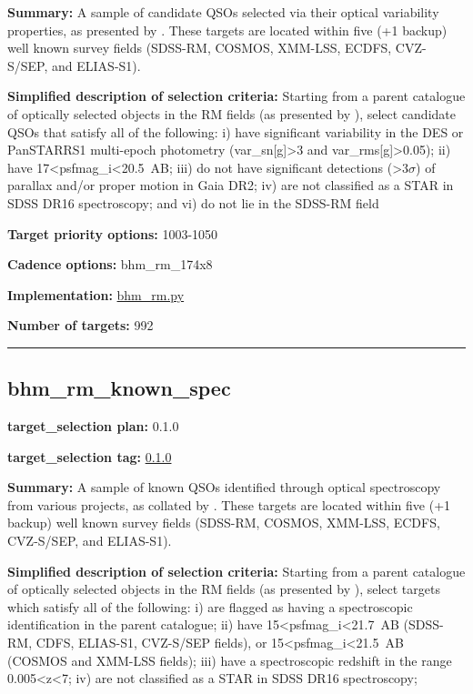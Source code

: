 \noindent\textbf{Summary:} A sample of candidate QSOs selected via their optical
variability properties, as presented by
\citet{Yang2022}. These targets are located within five (+1 backup) well
known survey fields (SDSS-RM, COSMOS, XMM-LSS, ECDFS, CVZ-S/SEP, and
ELIAS-S1).

\noindent\textbf{Simplified description of selection criteria:} Starting from a
parent catalogue of optically selected objects in the RM fields (as
presented by
\citealt{Yang2022}), select candidate QSOs that satisfy all of the
following: i) have significant variability in the DES or PanSTARRS1
multi-epoch photometry (var\_sn{[}g{]}\textgreater3 and
var\_rms{[}g{]}\textgreater0.05); ii) have
17\textless psfmag\_i\textless20.5~AB; iii) do not have significant
detections (\textgreater3$\sigma$) of parallax and/or proper motion in Gaia
DR2; iv) are not classified as a STAR in SDSS DR16 spectroscopy; and vi)
do not lie in the SDSS-RM field


\noindent\textbf{Target priority options:} 1003-1050

\noindent\textbf{Cadence options:} bhm\_rm\_174x8

\noindent\textbf{Implementation:}
\href{https://github.com/sdss/target_selection/blob/0.1.0/python/target_selection/cartons/bhm_rm.py}{bhm\_rm.py}

\noindent\textbf{Number of targets:} 992

\begin{center}\rule{0.5\linewidth}{0.5pt}\end{center}

\hypertarget{bhm_rm_known_spec_plan0.1.0}{%
\subsection{bhm\_rm\_known\_spec}\label{bhm_rm_known_spec_plan0.1.0}}

\noindent\textbf{target\_selection plan:} 0.1.0

\noindent\textbf{target\_selection tag:}
\href{https://github.com/sdss/target_selection/tree/0.1.0/}{0.1.0}

\noindent\textbf{Summary:} A sample of known QSOs identified through optical
spectroscopy from various projects, as collated by
\citet{Yang2022}. These targets are located within five (+1 backup) well
known survey fields (SDSS-RM, COSMOS, XMM-LSS, ECDFS, CVZ-S/SEP, and
ELIAS-S1).

\noindent\textbf{Simplified description of selection criteria:} Starting from a
parent catalogue of optically selected objects in the RM fields (as
presented by
\citealt{Yang2022}), select targets which satisfy all of the following: i)
are flagged as having a spectroscopic identification in the parent
catalogue; ii) have 15\textless psfmag\_i\textless21.7~AB (SDSS-RM,
CDFS, ELIAS-S1, CVZ-S/SEP fields), or
15\textless psfmag\_i\textless21.5~AB (COSMOS and XMM-LSS fields); iii)
have a spectroscopic redshift in the range 0.005\textless z\textless7;
iv) are not classified as a STAR in SDSS DR16 spectroscopy;


